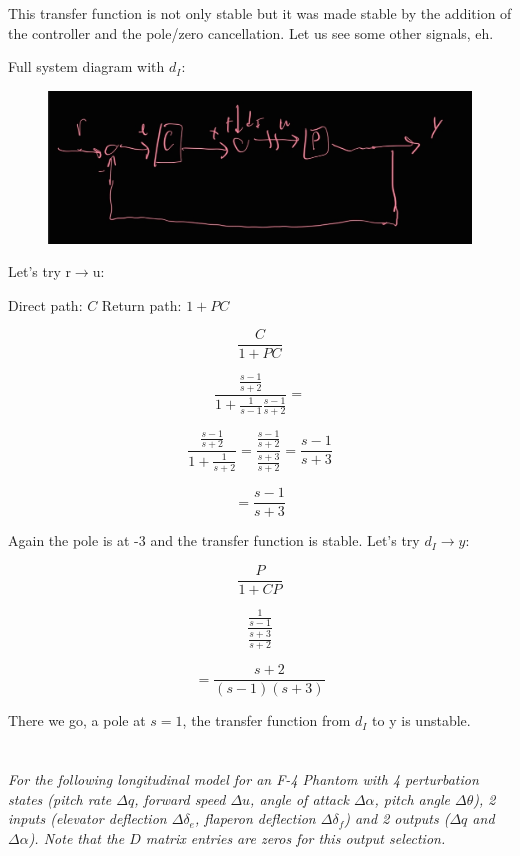 \documentclass{article}
\begin{document}
This transfer function is not only stable but it was made stable by the addition of the controller and the pole/zero cancellation. Let us see some other signals, eh.

Full system diagram with $d_I$:

\begin{figure}[H]
    \centering
    \includegraphics[width=\textwidth]{p1diyDiagram.jpg}
\end{figure}

Let's try r$\to$u:

Direct path: \(C\)
Return path: \(1 + PC\)

\[
\frac{C}{1+PC}
\]

\[
\frac{\frac{s-1}{s+2}}{1 + \frac{1}{s-1}\frac{s-1}{s+2}} =
\]

\[
\frac{\frac{s-1}{s+2}}{1 + \frac{1}{s+2}} = \frac{\frac{s-1}{s+2}}{\frac{s+3}{s+2}} = \frac{s-1}{s+3}
\]

\[
= \frac{s-1}{s+3}
\]

Again the pole is at -3 and the transfer function is stable.
Let's try $d_I \rightarrow y$:

\[
\frac{P}{1 + CP}
\]

\[
\frac{\frac{1}{s-1}}{\frac{s+3}{s+2}}
\]

\[
= \frac{s+2}{(s-1)(s+3)}
\]

There we go, a pole at $s = 1$, the transfer function from $d_I$ to y is unstable.

\section{}

\textit{For the following longitudinal model for an F-4 Phantom with 4 perturbation states (pitch rate \(\Delta q\), forward speed \(\Delta u\), angle of attack \(\Delta \alpha\), pitch angle \(\Delta \theta\)), 2 inputs (elevator deflection \(\Delta \delta_e\), flaperon deflection \(\Delta \delta_f\)) and 2 outputs (\(\Delta q\) and \(\Delta \alpha\)). Note that the \(D\) matrix entries are zeros for this output selection.}
\end{document}
